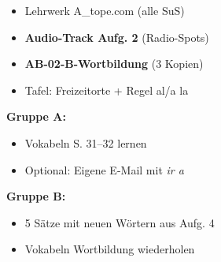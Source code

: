 \documentclass[11pt, a4paper]{article}
\begin{document}

\begin{minipage}[t]{0.48\textwidth}
\begin{tcolorbox}[
    colback=hellgrau,
    colframe=phase,
    title={\footnotesize\bfseries Material-Checkliste},
    fonttitle=\bfseries,
    boxrule=0.5pt,
    top=2pt, bottom=2pt, left=4pt, right=4pt
]
\footnotesize
\begin{itemize}
\item[$\square$] Lehrwerk A\_tope.com (alle SuS)
\item[$\square$] \textbf{Audio-Track Aufg. 2} (Radio-Spots)
\item[$\square$] \textbf{AB-02-B-Wortbildung} (3 Kopien)
\item[$\square$] Tafel: Freizeitorte + Regel al/a la
\end{itemize}
\end{tcolorbox}
\end{minipage}
\hfill
\begin{minipage}[t]{0.48\textwidth}
\begin{tcolorbox}[
    colback=spanisch!10,
    colframe=spanisch,
    title={\footnotesize\bfseries Hausaufgabe},
    fonttitle=\bfseries,
    boxrule=0.5pt,
    top=2pt, bottom=2pt, left=4pt, right=4pt
]
\footnotesize
\textbf{Gruppe A:}
\begin{itemize}
\item Vokabeln S. 31--32 lernen
\item Optional: Eigene E-Mail mit \textit{ir a}
\end{itemize}
\textbf{Gruppe B:}
\begin{itemize}
\item 5 Sätze mit neuen Wörtern aus Aufg. 4
\item Vokabeln Wortbildung wiederholen
\end{itemize}
\end{tcolorbox}
\end{minipage}

\vspace{0.3cm}

\end{document}
